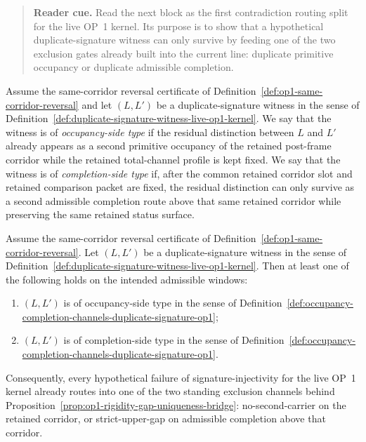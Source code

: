 \begin{quote}\small
\noindent\textbf{Reader cue.} Read the next block as the first contradiction routing split for the live OP~1 kernel. Its purpose is to show that a hypothetical duplicate-signature witness can only survive by feeding one of the two exclusion gates already built into the current line: duplicate primitive occupancy or duplicate admissible completion.
\end{quote}

\begin{definition}
\label{def:occupancy-completion-channels-duplicate-signature-op1}
Assume the same-corridor reversal certificate of Definition~\ref{def:op1-same-corridor-reversal} and let $(L,L')$ be a duplicate-signature witness in the sense of Definition~\ref{def:duplicate-signature-witness-live-op1-kernel}. We say that the witness is of \emph{occupancy-side type} if the residual distinction between $L$ and $L'$ already appears as a second primitive occupancy of the retained post-frame corridor while the retained total-channel profile is kept fixed. We say that the witness is of \emph{completion-side type} if, after the common retained corridor slot and retained comparison packet are fixed, the residual distinction can only survive as a second admissible completion route above that same retained corridor while preserving the same retained status surface.
\end{definition}

\begin{proposition}
\label{prop:duplicate-signature-witness-feeds-standing-op1-exclusion-gate}
Assume the same-corridor reversal certificate of Definition~\ref{def:op1-same-corridor-reversal}. Let $(L,L')$ be a duplicate-signature witness in the sense of Definition~\ref{def:duplicate-signature-witness-live-op1-kernel}. Then at least one of the following holds on the intended admissible windows:
\begin{enumerate}[label=(\roman*)]
    \item $(L,L')$ is of occupancy-side type in the sense of Definition~\ref{def:occupancy-completion-channels-duplicate-signature-op1};
    \item $(L,L')$ is of completion-side type in the sense of Definition~\ref{def:occupancy-completion-channels-duplicate-signature-op1}.
\end{enumerate}
Consequently, every hypothetical failure of signature-injectivity for the live OP~1 kernel already routes into one of the two standing exclusion channels behind Proposition~\ref{prop:op1-rigidity-gap-uniqueness-bridge}: no-second-carrier on the retained corridor, or strict-upper-gap on admissible completion above that corridor.
\end{proposition}

